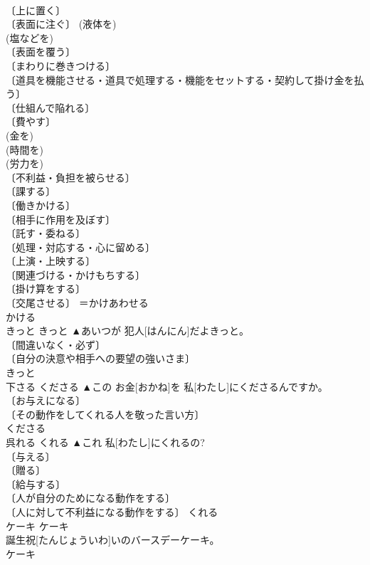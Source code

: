 \documentclass[8pt]{extreport}
\begin{document}
\begin{CJK}{UTF8}{min}
\\	〔上に置く〕 
\\	〔表面に注ぐ〕 (液体を) 
\\	(塩などを) 
\\	〔表面を覆う〕 
\\	〔まわりに巻きつける〕 
\\	〔道具を機能させる・道具で処理する・機能をセットする・契約して掛け金を払う〕 
\\	〔仕組んで陥れる〕 
\\	〔費やす〕 
\\	(金を) 
\\	(時間を) 
\\	(労力を) 
\\	〔不利益・負担を被らせる〕 
\\	〔課する〕 
\\	〔働きかける〕 
\\	〔相手に作用を及ぼす〕 
\\	〔託す・委ねる〕 
\\	〔処理・対応する・心に留める〕 
\\	〔上演・上映する〕 
\\	〔関連づける・かけもちする〕 
\\	〔掛け算をする〕 
\\	〔交尾させる〕 ＝かけあわせる 
\\	かける	
\\	きっと	きっと	▲あいつが 犯人[はんにん]だよきっと。	
\\	〔間違いなく・必ず〕 
\\	〔自分の決意や相手への要望の強いさま〕 
\\	きっと	
\\	下さる	くださる	▲この お金[おかね]を 私[わたし]にくださるんですか。	
\\	〔お与えになる〕 
\\	〔その動作をしてくれる人を敬った言い方〕 
\\	くださる	
\\	呉れる	くれる	▲これ 私[わたし]にくれるの?	
\\	〔与える〕 
\\	〔贈る〕 
\\	〔給与する〕 
\\	〔人が自分のためになる動作をする〕 
\\	〔人に対して不利益になる動作をする〕		くれる	
\\	ケーキ	ケーキ	
\\	誕生祝[たんじょういわ]いの{バースデー}ケーキ。	
\\	ケーキ	

\end{CJK}
\end{document}
